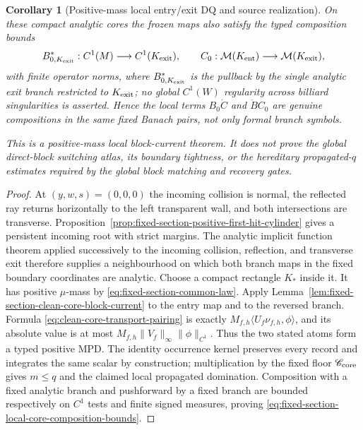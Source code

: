 \documentclass[11pt]{article}
\newtheorem{corollary}[theorem]{Corollary}
\begin{document}
\begin{corollary}[Positive-mass local entry/exit DQ and source realization]
On these compact analytic cores the frozen maps also satisfy the typed
composition bounds
\begin{equation}
\label{eq:fixed-section-local-core-composition-bounds}
 B_{0,K_{\rm exit}}^*:C^1(M)\longrightarrow C^1(K_{\rm exit}),
 \qquad
 C_0:\mathcal M(K_{\rm ent})\longrightarrow
       \mathcal M(K_{\rm exit}),
\end{equation}
with finite operator norms, where $B_{0,K_{\rm exit}}^*$ is the pullback by
the single analytic exit branch restricted to $K_{\rm exit}$; no global
$C^1(W)$ regularity across billiard singularities is asserted.  Hence the
local terms $B_0\dot C$ and
$\dot B C_0$ are genuine compositions in the same fixed Banach pairs, not
only formal branch symbols.

This is a positive-mass local block-current theorem.  It does not prove the
global direct-block switching atlas, its boundary tightness, or the
hereditary propagated-$q$ estimates required by the global block matching
and recovery gates.
\end{corollary}

\begin{proof}
At $(y,w,s)=(0,0,0)$ the incoming collision is normal, the reflected ray
returns horizontally to the left transparent wall, and both intersections
are transverse.  Proposition~\ref{prop:fixed-section-positive-first-hit-cylinder}
gives a persistent incoming root with strict margins.  The analytic implicit
function theorem applied successively to the incoming collision, reflection,
and transverse exit therefore supplies a neighbourhood on which both branch
maps in the fixed boundary coordinates are analytic.  Choose a compact
rectangle $K_*$ inside it.  It has positive $\mu$-mass by
\eqref{eq:fixed-section-common-law}.  Apply
Lemma~\ref{lem:fixed-section-clean-core-block-current} to the entry map and
to the reversed branch.  Formula
\eqref{eq:clean-core-transport-pairing} is exactly
$M_{f,h}\langle U_f\nu_{f,h},\phi\rangle$, and its absolute value is at most
$M_{f,h}\|V_f\|_\infty\|\phi\|_{C^1}$.  Thus the two stated atoms form a typed
positive MPD.  The identity occurrence kernel preserves every record and
integrates the same scalar by construction; multiplication by the fixed
floor $\mathscr C_{\rm core}$ gives $m\le q$ and the claimed local
propagated domination.  Composition with a fixed analytic branch and
pushforward by a fixed branch are bounded respectively on $C^1$ tests and
finite signed measures, proving
\eqref{eq:fixed-section-local-core-composition-bounds}.
\end{proof}
\end{document}
